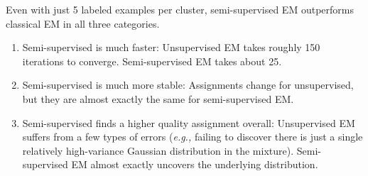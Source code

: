 \begin{answer}
  Even with just 5 labeled examples per cluster, semi-supervised EM outperforms classical EM in all three categories.
  \begin{enumerate}[label=\roman*.]
    \item Semi-supervised is much faster: Unsupervised EM takes roughly 150 iterations to converge. Semi-supervised EM takes about 25.
    \item Semi-supervised is much more stable: Assignments change for unsupervised, but they are almost exactly the same for semi-supervised EM.
    \item Semi-supervised finds a higher quality assignment overall: Unsupervised EM suffers from a few types of errors (\emph{e.g.,} failing to discover there is just a single relatively high-variance Gaussian distribution in the mixture). Semi-supervised EM almost exactly uncovers the underlying distribution.
  \end{enumerate}
\end{answer}
